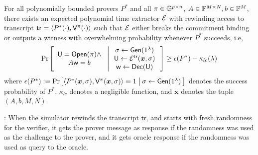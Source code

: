 \begin{lemma}[Soundness]\label{lem:linercheck_sound}
For all polynomially bounded provers $P^\ast$ and all $\pi\in \mathbb{G}^{p\times n}$,
$A\in \mathbb{F}^{M\times N}, b\in \mathbb{F}^M$, there exists an expected polynomial time
extractor $\mathcal{E}$ with rewinding access to transcript $\mathsf{tr}=\langle
P^\ast(\cdot),\mathsf{V}^\pi(\cdot)\rangle$ such that $\mathcal{E}$ either breaks the 
commitment binding or outputs a witness with overwhelming probability whenever 
$P^\ast$ succeeds, i.e,
{\small
\begin{align*}
\condprob{\begin{array}{c}
\ewit=\open(\pi)\wedge \\
A\wit=b
\end{array}
}{
\begin{array}{c}
\sigma\gets \gen(\secparam) \\
\ewit\gets \extr^{\mathsf{tr}}(\bm{x},\sigma) \\
\wit\gets \dec(\ewit)
\end{array}}\geq
\epsilon(P^\ast)-\kappa_{lc}(\secpar)
\end{align*}
}
where $\epsilon(P^\ast):= \condprob{\langle P^\ast(\bm{x},\sigma),\verifier^\pi(\bm{x},\sigma)\rangle=1}{\sigma\gets \gen(\secparam)}$ denotes the success probability of $P^\ast$, $\kappa_{lc}$ denotes a negligible function, and $\bm{x}$ denotes the tuple $(A,b,M,N)$.
\end{lemma}

: When the simulator rewinds the transcript $\mathsf{tr}$,
and starts with fresh randomness for the verifier, it gets the prover message as
response if the randomness was used as the challenge to the prover, and it gets
oracle response if the randomness was used as query to the oracle.

